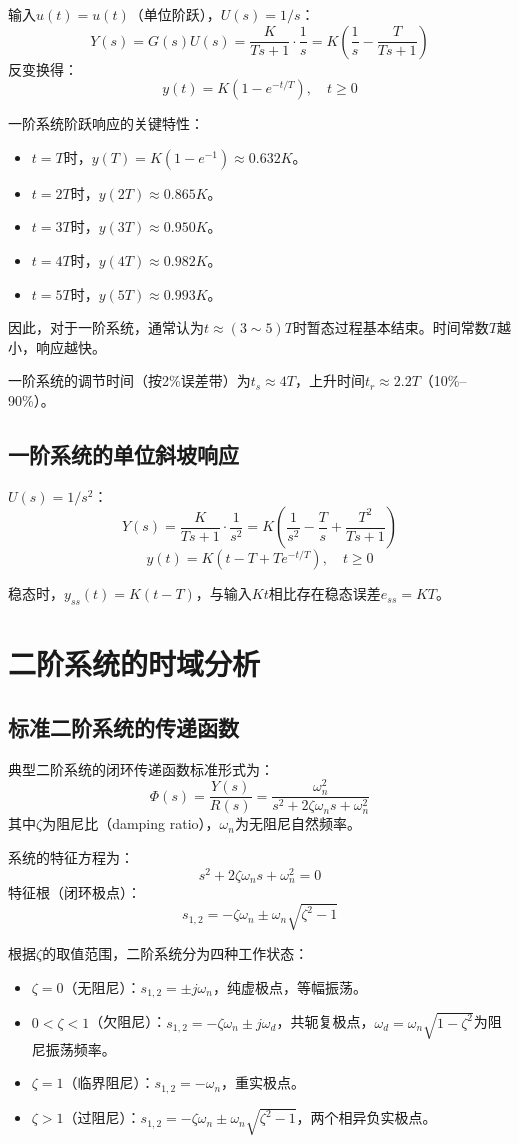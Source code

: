输入$u(t) = u(t)$（单位阶跃），$U(s) = 1/s$：
\[
Y(s) = G(s)U(s) = \frac{K}{Ts+1} \cdot \frac{1}{s} = K\left( \frac{1}{s} - \frac{T}{Ts+1} \right)
\]
反变换得：
\[
y(t) = K(1 - e^{-t/T}), \quad t \geq 0
\]

一阶系统阶跃响应的关键特性：
\begin{itemize}
\item $t = T$时，$y(T) = K(1-e^{-1}) \approx 0.632K$。
\item $t = 2T$时，$y(2T) \approx 0.865K$。
\item $t = 3T$时，$y(3T) \approx 0.950K$。
\item $t = 4T$时，$y(4T) \approx 0.982K$。
\item $t = 5T$时，$y(5T) \approx 0.993K$。
\end{itemize}

因此，对于一阶系统，通常认为$t \approx (3\sim5)T$时暂态过程基本结束。时间常数$T$越小，响应越快。

一阶系统的调节时间（按2\%误差带）为$t_s \approx 4T$，上升时间$t_r \approx 2.2T$（10\%--90\%）。

\subsection{一阶系统的单位斜坡响应}

$U(s) = 1/s^2$：
\[
Y(s) = \frac{K}{Ts+1}\cdot\frac{1}{s^2} = K\left(\frac{1}{s^2} - \frac{T}{s} + \frac{T^2}{Ts+1}\right)
\]
\[
y(t) = K(t - T + Te^{-t/T}), \quad t \geq 0
\]

稳态时，$y_{ss}(t) = K(t - T)$，与输入$Kt$相比存在稳态误差$e_{ss} = KT$。

\section{二阶系统的时域分析}

\subsection{标准二阶系统的传递函数}

典型二阶系统的闭环传递函数标准形式为：
\[
\Phi(s) = \frac{Y(s)}{R(s)} = \frac{\omega_n^2}{s^2 + 2\zeta\omega_n s + \omega_n^2}
\]
其中$\zeta$为阻尼比（damping ratio），$\omega_n$为无阻尼自然频率。

系统的特征方程为：
\[
s^2 + 2\zeta\omega_n s + \omega_n^2 = 0
\]
特征根（闭环极点）：
\[
s_{1,2} = -\zeta\omega_n \pm \omega_n\sqrt{\zeta^2 - 1}
\]

根据$\zeta$的取值范围，二阶系统分为四种工作状态：
\begin{itemize}
\item $\zeta = 0$（无阻尼）：$s_{1,2} = \pm j\omega_n$，纯虚极点，等幅振荡。
\item $0 < \zeta < 1$（欠阻尼）：$s_{1,2} = -\zeta\omega_n \pm j\omega_d$，共轭复极点，$\omega_d = \omega_n\sqrt{1-\zeta^2}$为阻尼振荡频率。
\item $\zeta = 1$（临界阻尼）：$s_{1,2} = -\omega_n$，重实极点。
\item $\zeta > 1$（过阻尼）：$s_{1,2} = -\zeta\omega_n \pm \omega_n\sqrt{\zeta^2-1}$，两个相异负实极点。
\end{itemize}

